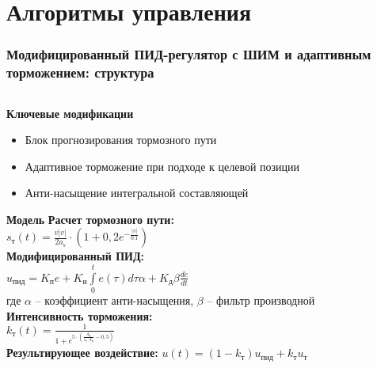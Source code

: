 \section{Алгоритмы управления}
\begin{frame}
	\frametitle{Модифицированный ПИД-регулятор с ШИМ и адаптивным торможением: структура}

	\begin{columns}[T]
		\begin{column}{0.5\textwidth}
			\vspace{-1em}
			\begin{block}{\scriptsize \textbf{Ключевые модификации}}
				\begin{itemize}
					\item \scriptsize Блок прогнозирования тормозного пути
					\item \scriptsize Адаптивное торможение при подходе к целевой позиции
					\item \scriptsize Анти-насыщение интегральной составляющей
				\end{itemize}
			\end{block}

			\vspace{-0.5em}

			\begin{scriptsize}
				\begin{block}{\scriptsize \textbf{Модель}}
					\textbf{Расчет тормозного пути:}\\
					$	s_{\text{т}}(t) = \frac{v|v|}{2a_{\text{т}}} \cdot \left(1 + 0,2e^{-\frac{|v|}{0.1}}\right)$\\
					\textbf{Модифицированный ПИД:}\\
					$
						u_{\text{пид}} = K_{\text{п}}e + K_{\text{и}}\int\limits_{0}^{t}e(\tau)d\tau\alpha + K_{\text{д}}\beta\frac{de}{dt}
					$\\
					где $\alpha$ -- коэффициент анти-насыщения, $\beta$ -- фильтр производной\\
					\textbf{Интенсивность торможения:}\\
					$
						k_{\text{т}}(t) = \frac{1}{1 + e^{5 \cdot \left(\frac{d_{\text{ц}}}{s_{\text{т}} \cdot k_{\text{п}}} - 0,5\right)}}
					$\\
					\textbf{Результирующее воздействие:}
					$
						u(t) = (1 - k_{\text{т}})u_{\text{пид}} + k_{\text{т}}u_{\text{т}}
					$\\
				\end{block}

			\end{scriptsize}
		\end{column}


\end{columns}
\end{frame}
